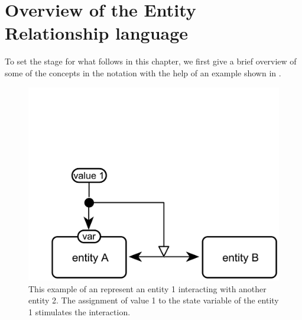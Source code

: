 
\section{Overview of the Entity Relationship language}\label{sec:overview}

To set the stage for what follows in this chapter, we first give a brief overview of some of the concepts in the \ER notation with the help of an example shown in . 

\begin{figure}[H]
  \centering
  \vspace*{-0.75em}
  \includegraphics[scale=0.45]{examples/HelloWorld}
   \caption{This example of an \ERm represent an entity 1 interacting with another entity 2. The assignment of value 1 to the state variable of the entity 1 stimulates the interaction.}
  \label{fig:eg1}
\end{figure}

